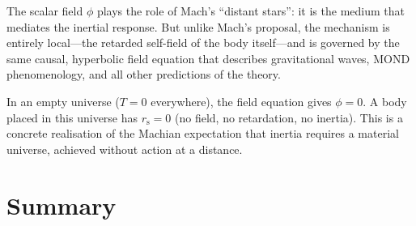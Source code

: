 \documentclass[11pt]{article}
\newcommand{\rs}{r_{\mathrm{s}}}
\begin{document}
The scalar field $\phi$ plays the role of Mach's
``distant stars'': it is the medium that mediates the
inertial response.  But unlike Mach's proposal, the
mechanism is entirely local---the retarded self-field
of the body itself---and is governed by the same causal,
hyperbolic field equation that describes gravitational
waves, MOND phenomenology, and all other predictions
of the theory.

In an empty universe ($T = 0$ everywhere), the field
equation gives $\phi = 0$.  A body placed in this
universe has $\rs = 0$ (no field, no retardation, no
inertia).  This is a concrete realisation of the Machian
expectation that inertia requires a material universe,
achieved without action at a distance.

\section{Summary}\label{sec:summary_app17}
\end{document}
